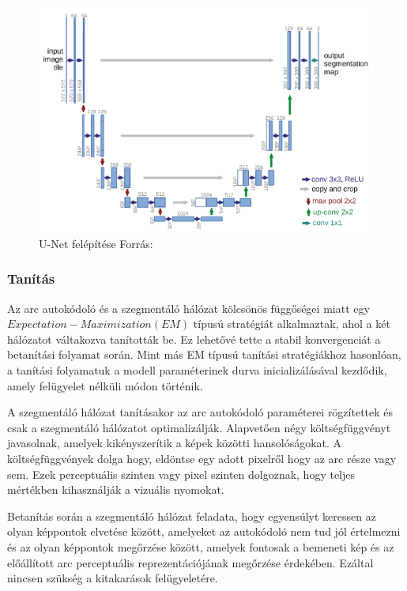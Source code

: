 \documentclass[12pt,a4]{article}
\begin{document}
                \begin{figure}[h]	
     	              \centering
     	        	\includegraphics[width=1\linewidth]{unet}
     	        	\caption{U-Net felépítése
     	        		Forrás:\cite{unet}}
                    \label{fig:unet}
     	        \end{figure}
 	
            \subsubsection{Tanítás}
            
         	      Az arc autokódoló és a szegmentáló hálózat kölcsönös függőségei miatt 
                egy $Expectation − Maximization(EM)$ típusú stratégiát alkalmaztak,
         	      ahol a két hálózatot váltakozva tanították be. Ez lehetővé tette a stabil
         	      konvergenciát a betanítási folyamat során. Mint más EM típusú tanítási
         	      stratégiákhoz hasonlóan, a tanítási folyamatuk a modell paraméterinek
         	      durva inicializálásával kezdődik, amely felügyelet nélküli módon történik.
         	
         	      A szegmentáló hálózat tanításakor az arc autokódoló paraméterei
         	      rögzítettek és csak a szegmentáló hálózatot optimalizálják. Alapvetően 
                négy költségfüggvényt javasolnak, amelyek kikényszerítik a képek közötti hansolóságokat. A költségfüggvények dolga hogy, eldöntse egy adott pixelről hogy az arc része vagy sem. Ezek perceptuális szinten vagy pixel szinten dolgoznak, hogy teljes mértékben kihasználják a vizuális nyomokat.
         	
         	      Betanítás során a szegmentáló hálózat feladata, hogy egyensúlyt
         	      keressen az olyan képpontok elvetése között, amelyeket az autokódoló nem
         	      tud jól értelmezni és az olyan képpontok megőrzése között, amelyek fontosak
         	      a bemeneti kép és az előállított arc perceptuális reprezentációjának 
                megőrzése érdekében. Ezáltal nincsen szükség a kitakarások felügyeletére.
         	
\end{document}
